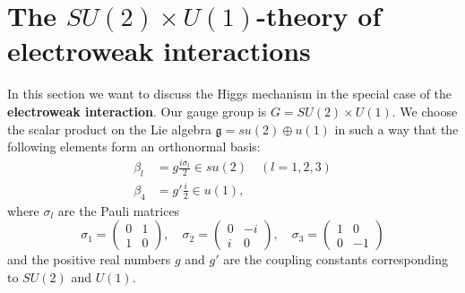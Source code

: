 \documentclass[12pt]{amsart}
\theoremstyle{definition}
\theoremstyle{remark}
\numberwithin{equation}{section}
\begin{document}
\section{The $SU(2)\times U(1)$-theory of electroweak interactions}\label{section electroweak}

In this section we want to discuss the Higgs mechanism in the special case of the {\bf electroweak interaction}. Our gauge group is $G=SU(2)\times U(1)$. We choose the scalar product on the Lie algebra $\mathfrak{g}=su(2)\oplus u(1)$ in such a way that the following elements form an orthonormal basis: 
\begin{align*}
\beta_l&=g\frac{i\sigma_l}{2}\in su(2)\quad(l=1,2,3)\\
\beta_4&=g'\frac{i}{2}\in u(1),
\end{align*}
where $\sigma_l$ are the Pauli matrices
\begin{equation*}
\sigma_1=\left(\begin{array}{cc}0&1\\1&0\end{array}\right),\quad\sigma_2=\left(\begin{array}{cc}0&-i\\i&0\end{array}\right),\quad\sigma_3=\left(\begin{array}{cc}1&0\\0&-1\end{array}\right)
\end{equation*} 
and the positive real numbers $g$ and $g'$ are the coupling constants corresponding to $SU(2)$ and $U(1)$. 
\end{document}
